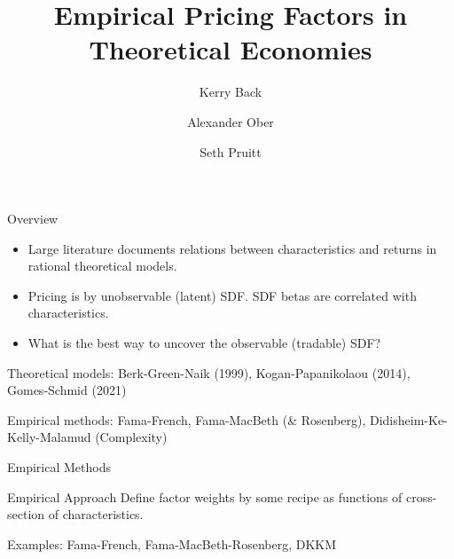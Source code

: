 \documentclass[aspectratio=169]{beamer}
\title{Empirical Pricing Factors in Theoretical Economies}
\author{Kerry Back \and Alexander Ober \and Seth Pruitt}
\date{}
\begin{document}
\begin{frame}
  \titlepage
\end{frame}

\begin{frame}{Overview}

  \begin{itemize}
    \item Large literature documents relations between characteristics and returns in rational theoretical models.
    \item Pricing is by unobservable (latent) SDF.  SDF betas are correlated with characteristics.
    \item What is the best way to uncover the observable (tradable) SDF?
  \end{itemize}
\pause
\vspace{0.1cm}

Theoretical models: Berk-Green-Naik (1999), Kogan-Papanikolaou (2014), Gomes-Schmid (2021)
\pause
\vspace{0.3cm}

Empirical methods: Fama-French, Fama-MacBeth (\& Rosenberg), Didisheim-Ke-Kelly-Malamud (Complexity)
\end{frame}


\begin{frame}[c]
  \centering
  \Huge Empirical Methods
\end{frame}


\begin{frame}{Empirical Approach}
Define factor weights by some recipe as functions of cross-section of characteristics.

\vspace{0.5cm}
Examples: Fama-French, Fama-MacBeth-Rosenberg, DKKM
\end{frame}
\end{document}
